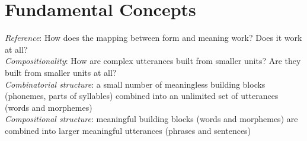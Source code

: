 \section{Fundamental Concepts}
\emph{Reference}: How does the mapping between form and meaning work? Does it work at all?\\
\emph{Compositionality}: How are
complex utterances built from
smaller units? Are they built
from smaller units at all?\\
\emph{Combinatorial structure}: a small number of meaningless building blocks (phonemes, parts of syllables) combined into an unlimited set of utterances (words and morphemes)\\
\emph{Compositional structure}: meaningful building blocks (words and morphemes) are combined into larger meaningful utterances (phrases and
sentences)